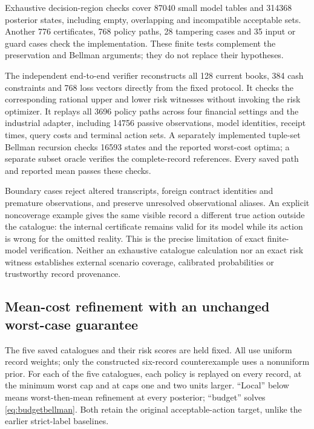 \documentclass[11pt,a4paper]{article}
\theoremstyle{definition}\newtheorem{definition}[theorem]{Definition}
\begin{document}
Exhaustive decision-region checks cover 87040 small model tables and 314368 posterior states, including empty, overlapping and incompatible acceptable sets. Another 776 certificates, 768 policy paths, 28 tampering cases and 35 input or guard cases check the implementation. These finite tests complement the preservation and Bellman arguments; they do not replace their hypotheses.

The independent end-to-end verifier reconstructs all 128 current books, 384 cash constraints and 768 loss vectors directly from the fixed protocol. It checks the corresponding rational upper and lower risk witnesses without invoking the risk optimizer. It replays all 3696 policy paths across four financial settings and the industrial adapter, including 14756 passive observations, model identities, receipt times, query costs and terminal action sets. A separately implemented tuple-set Bellman recursion checks 16593 states and the reported worst-cost optima; a separate subset oracle verifies the complete-record references. Every saved path and reported mean passes these checks.

Boundary cases reject altered transcripts, foreign contract identities and premature observations, and preserve unresolved observational aliases. An explicit noncoverage example gives the same visible record a different true action outside the catalogue: the internal certificate remains valid for its model while its action is wrong for the omitted reality. This is the precise limitation of exact finite-model verification. Neither an exhaustive catalogue calculation nor an exact risk witness establishes external scenario coverage, calibrated probabilities or trustworthy record provenance.
\FloatBarrier


\subsection{Mean-cost refinement with an unchanged worst-case guarantee}\label{sec:budgetresults}
The five saved catalogues and their risk scores are held fixed. All use uniform record weights; only the constructed six-record counterexample uses a nonuniform prior. For each of the five catalogues, each policy is replayed on every record, at the minimum worst cap and at caps one and two units larger. ``Local'' below means worst-then-mean refinement at every posterior; ``budget'' solves \eqref{eq:budgetbellman}. Both retain the original acceptable-action target, unlike the earlier strict-label baselines.
\end{document}
